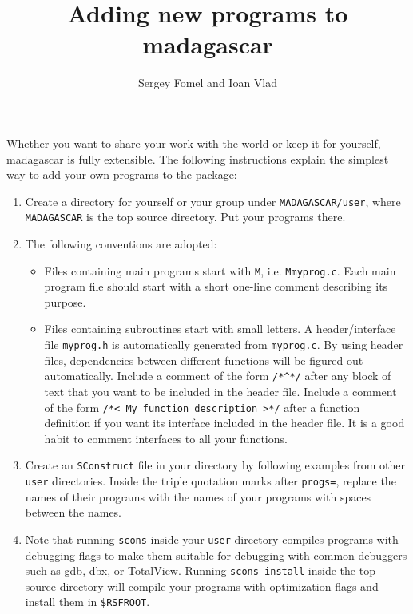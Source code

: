 \title{Adding new programs to madagascar}
\author{Sergey Fomel and Ioan Vlad}

\maketitle

Whether you want to share your work with the world or keep it for
yourself, madagascar is fully extensible. The following instructions
explain the simplest way to add your own programs to the package:

\begin{enumerate}
\item Create a directory for yourself or your group under
\texttt{MADAGASCAR/user}, where \texttt{MADAGASCAR} is the top source
directory. Put your programs there. 
\item The following conventions are adopted:
\begin{itemize}
\item Files containing main programs start with \texttt{M},
i.e. \texttt{Mmyprog.c}. Each main program file should start with a
short one-line comment describing its purpose.
\item Files containing subroutines start with small letters. A
header/interface file \texttt{myprog.h} is automatically generated
from \texttt{myprog.c}. By using header files, dependencies between
different functions will be figured out automatically. Include a
comment of the form \verb#/*^*/# after any block of text that you
want to be included in the header file. Include a comment of the form
\verb#/*< My function description >*/# after a function definition
if you want its interface included in the header file.  It is a good
habit to comment interfaces to all your functions.
\end{itemize}
\item Create an \texttt{SConstruct} file in your directory by following examples from other \texttt{user} directories. 
Inside the triple quotation marks after \texttt{progs=}, replace the
names of their programs with the names of your programs with spaces
between the names.
\item Note that running \texttt{scons} inside your \texttt{user}
directory compiles programs with debugging flags to make them
suitable for debugging with common debuggers such as
\href{http://www.gnu.org/software/gdb/}{gdb}, dbx, or
\href{http://www.etnus.com/}{TotalView}. Running 
\texttt{scons install} inside the top source directory will compile your programs with optimization flags and install them in \texttt{\$RSFROOT}.

\end{enumerate}
